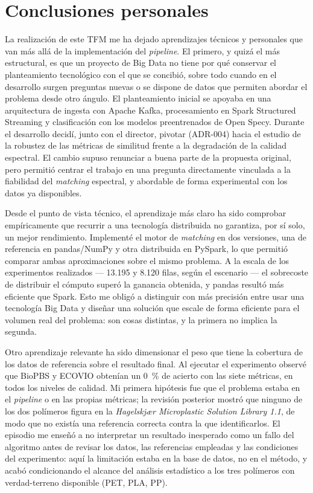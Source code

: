 \section{Conclusiones personales}

La realización de este TFM me ha dejado aprendizajes técnicos y personales que van más allá de la implementación del \textit{pipeline}. El primero, y quizá el más estructural, es que un proyecto de Big Data no tiene por qué conservar el planteamiento tecnológico con el que se concibió, sobre todo cuando en el desarrollo surgen preguntas nuevas o se dispone de datos que permiten abordar el problema desde otro ángulo. El planteamiento inicial se apoyaba en una arquitectura de ingesta con Apache Kafka, procesamiento en Spark Structured Streaming y clasificación con los modelos preentrenados de Open Specy. Durante el desarrollo decidí, junto con el director, pivotar (ADR-004) hacia el estudio de la robustez de las métricas de similitud frente a la degradación de la calidad espectral. El cambio supuso renunciar a buena parte de la propuesta original, pero permitió centrar el trabajo en una pregunta directamente vinculada a la fiabilidad del \textit{matching} espectral, y abordable de forma experimental con los datos ya disponibles.

Desde el punto de vista técnico, el aprendizaje más claro ha sido comprobar empíricamente que recurrir a una tecnología distribuida no garantiza, por sí solo, un mejor rendimiento. Implementé el motor de \textit{matching} en dos versiones, una de referencia en pandas/NumPy y otra distribuida en PySpark, lo que permitió comparar ambas aproximaciones sobre el mismo problema. A la escala de los experimentos realizados --- 13.195 y 8.120 filas, según el escenario --- el sobrecoste de distribuir el cómputo superó la ganancia obtenida, y pandas resultó más eficiente que Spark. Esto me obligó a distinguir con más precisión entre usar una tecnología Big Data y diseñar una solución que escale de forma eficiente para el volumen real del problema: son cosas distintas, y la primera no implica la segunda.

Otro aprendizaje relevante ha sido dimensionar el peso que tiene la cobertura de los datos de referencia sobre el resultado final. Al ejecutar el experimento observé que BioPBS y ECOVIO obtenían un 0~\% de acierto con las siete métricas, en todos los niveles de calidad. Mi primera hipótesis fue que el problema estaba en el \textit{pipeline} o en las propias métricas; la revisión posterior mostró que ninguno de los dos polímeros figura en la \emph{Hagelskjær Microplastic Solution Library 1.1}, de modo que no existía una referencia correcta contra la que identificarlos. El episodio me enseñó a no interpretar un resultado inesperado como un fallo del algoritmo antes de revisar los datos, las referencias empleadas y las condiciones del experimento: aquí la limitación estaba en la base de datos, no en el método, y acabó condicionando el alcance del análisis estadístico a los tres polímeros con verdad-terreno disponible (PET, PLA, PP).

